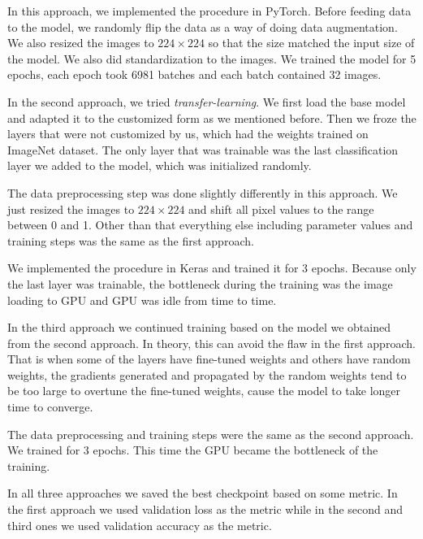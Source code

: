 \documentclass{amia}
\begin{document}
In this approach, we implemented the procedure in PyTorch. Before feeding data to the model, we randomly flip the data as a way of doing data augmentation. We also resized the images to $224 \times 224$ so that the size matched the input size of the model. We also did standardization to the images. We trained the model for 5 epochs, each epoch took 6981 batches and each batch contained 32 images.

In the second approach, we tried \textit{transfer-learning}. We first load the base model and adapted it to the customized form as we mentioned before. Then we froze the layers that were not customized by us, which had the weights trained on ImageNet dataset. The only layer that was trainable was the last classification layer we added to the model, which was initialized randomly.

The data preprocessing step was done slightly differently in this approach. We just resized the images to $224 \times 224$ and shift all pixel values to the range between 0 and 1. Other than that everything else including parameter values and training steps was the same as the first approach.


We implemented the procedure in Keras and trained it for 3 epochs. Because only the last layer was trainable, the bottleneck during the training was the image loading to GPU and GPU was idle from time to time.

In the third approach we continued training based on the model we obtained from the second approach. In theory, this can avoid the flaw in the first approach. That is when some of the layers have fine-tuned weights and others have random weights, the gradients generated and propagated by the random weights tend to be too large to overtune the fine-tuned weights, cause the model to take longer time to converge.

The data preprocessing and training steps were the same as the second approach. We trained for 3 epochs. This time the GPU became the bottleneck of the training.

In all three approaches we saved the best checkpoint based on some metric. In the first approach we used validation loss as the metric while in the second and third ones we used validation accuracy as the metric.
\end{document}
